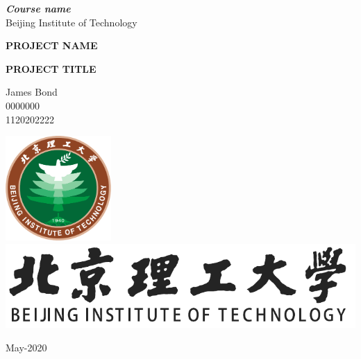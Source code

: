 \documentclass[11pt,english, openany]{book}
\begin{document}

\begin{titlepage}
	\clearpage\thispagestyle{empty}
	\centering
	\vspace{1cm}

	{\normalsize \textbf{\textit{Course name}} \\ 
		Beijing Institute of Technology \par}
		\vspace{5.5cm}
	{\Huge \textbf{PROJECT NAME}} \\
	\vspace{0.6cm}
	{\large \textbf{PROJECT TITLE} \par}
	\vspace{4.3cm}
	{\normalsize James Bond \\ %
	             0000000 \\
	             1120202222\par}
	\vspace{2.6cm}
    
    \centering \includegraphics[height=4cm]{bit_logo.pdf}\\ %
    \centering \includegraphics[scale=0.4]{logo_slogan.pdf}
    \vspace{0.5cm}

		
	{\normalsize May-2020 \par}
	
	\pagebreak

\end{titlepage}
\end{document}

